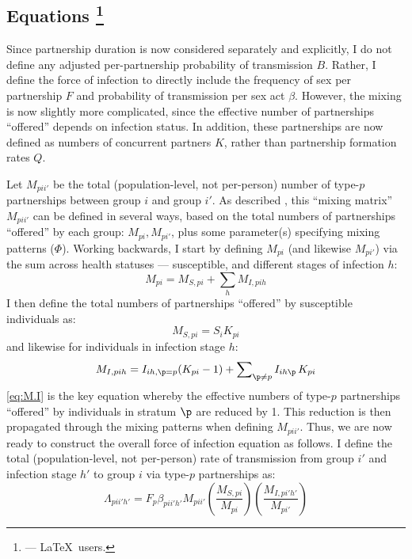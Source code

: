 \subsection[Equations]{Equations%
  \footnote{ --- \LaTeX\ users.}}\label{foi.prop.eq}
Since partnership duration is now considered separately and explicitly,
I do not define any adjusted per-partnership probability of transmission $B$.
Rather, I define the force of infection to directly include
the frequency of sex per partnership $F$ and probability of transmission per sex act $\beta$.
However, the mixing is now slightly more complicated,
since the effective number of partnerships ``offered'' depends on infection status.
In addition, these partnerships are now defined as numbers of concurrent partners $K$,
rather than partnership formation rates $Q$.
\par
Let $M_{pii'}$ be the total (population-level, not per-person)
number of type-$p$ partnerships between group $i$ and group $i'$.
As described , this ``mixing matrix'' $M_{pii'}$ can be defined in several ways,
based on the total numbers of partnerships ``offered'' by each group: $M_{pi}, M_{pi'}$,
plus some parameter(s) specifying mixing patterns (\eg $\Phi$).
Working backwards, I start by defining $M_{pi}$ (and likewise $M_{pi'}$) via
the sum across health statuses --- \ie susceptible, and different stages of infection $h$:
\begin{equation}
  M_{pi} = M_{S,pi} + \sum_h M_{I,pih}
\end{equation}
I then define the total numbers of partnerships ``offered'' by susceptible individuals as:
\begin{equation}
  M_{S,pi} = S_{i} K_{pi} \label{eq:M.S}
\end{equation}
and likewise for individuals in infection stage $h$:
\begin{equation}
  M_{I,pih} = I_{ih,\p=p} (K_{pi}-1) + \sum\nolimits_{\p \ne p} I_{ih\p}\,K_{pi} \label{eq:M.I}
\end{equation}
\eqref{eq:M.I} is the key equation whereby
the effective numbers of type-$p$ partnerships ``offered'' by
individuals in stratum $\p$ are reduced by 1.
This reduction is then propagated through the mixing patterns when defining $M_{pii'}$.
Thus, we are now ready to construct the overall force of infection equation as follows.
I define the total (population-level, not per-person) rate of transmission
from group $i'$ and infection stage $h'$ to group $i$ via type-$p$ partnerships as:
\begin{equation}
  \Lambda_{pii'h'} = F_p \beta_{pii'h'} M_{pii'}
  \left(\frac{M_{S,pi}}{M_{pi}}\right)
  \left(\frac{M_{I,pi'h'}}{M_{pi'}}\right)
\end{equation}
